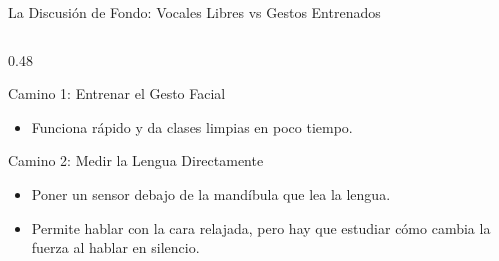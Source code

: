 \begin{frame}{La Discusión de Fondo: Vocales Libres vs Gestos Entrenados}
\begin{columns}[t]
\begin{column}{0.48\textwidth}
\begin{exampleblock}{Camino 1: Entrenar el Gesto Facial}
\begin{itemize}
\begin{itemize}
                    \end{itemize}
                    \item Funciona rápido y da clases limpias en poco tiempo.
                \end{itemize}
            \end{exampleblock}
            \vspace{0.04cm}
            \begin{block}{Camino 2: Medir la Lengua Directamente}
                \begin{itemize}\setlength{\itemsep}{1pt}\setlength{\parskip}{0pt}
                    \item Poner un sensor debajo de la mandíbula que lea la lengua.
                    \item Permite hablar con la cara relajada, pero hay que estudiar cómo cambia la fuerza al hablar en silencio.
                \end{itemize}
            \end{block}
        \end{column}
    \end{columns}
\end{frame}
